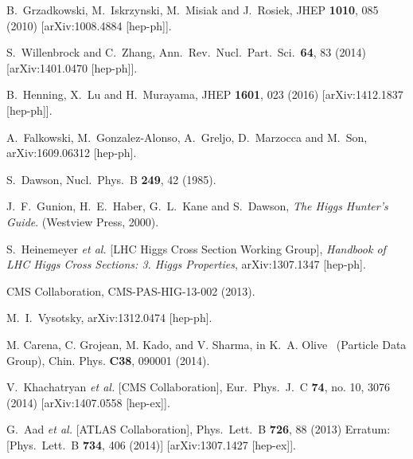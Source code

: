 \documentclass[12pt]{article}
\begin{document}
\begin{thebibliography}{99}
 B.~Grzadkowski, M.~Iskrzynski, M.~Misiak and J.~Rosiek,
  JHEP {\bf 1010}, 085 (2010)
  [arXiv:1008.4884 [hep-ph]].

 S.~Willenbrock and C.~Zhang,
  Ann.\ Rev.\ Nucl.\ Part.\ Sci.\  {\bf 64}, 83 (2014)
  [arXiv:1401.0470 [hep-ph]].
 
 B.~Henning, X.~Lu and H.~Murayama,
  JHEP {\bf 1601}, 023 (2016)
  [arXiv:1412.1837 [hep-ph]].

 A.~Falkowski, M.~Gonzalez-Alonso, A.~Greljo, D.~Marzocca and M.~Son,
  arXiv:1609.06312 [hep-ph].
 
 S.~Dawson,
  Nucl.\ Phys.\ B {\bf 249}, 42 (1985).

 J.~F.~Gunion, H.~E.~Haber, G.~L.~Kane and S.~Dawson,
{\it The Higgs Hunter's Guide}.   (Westview Press, 2000). 
 

  S.~Heinemeyer {\it et al.} [LHC Higgs Cross Section Working Group],
{\it Handbook of LHC Higgs Cross Sections: 3. Higgs Properties},
  arXiv:1307.1347 [hep-ph].

CMS Collaboration, CMS-PAS-HIG-13-002 (2013). 

  M.~I.~Vysotsky,
  arXiv:1312.0474 [hep-ph].


M. Carena, C. Grojean, M. Kado, and V. Sharma, in 
K.~A. Olive \etal\  (Particle Data Group), Chin. Phys. {\bf C38}, 090001 (2014).

 V.~Khachatryan {\it et al.} [CMS Collaboration],
  Eur.\ Phys.\ J.\ C {\bf 74}, no. 10, 3076 (2014)
  [arXiv:1407.0558 [hep-ex]].


 G.~Aad {\it et al.} [ATLAS Collaboration],
  Phys.\ Lett.\ B {\bf 726}, 88 (2013)
  Erratum: [Phys.\ Lett.\ B {\bf 734}, 406 (2014)]
  [arXiv:1307.1427 [hep-ex]].




\end{thebibliography}
\end{document}
